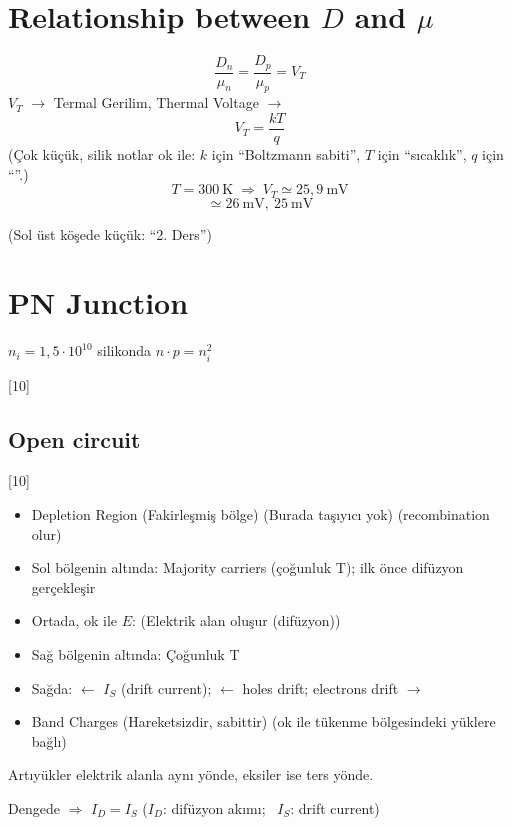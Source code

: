 \documentclass[11pt,a4paper]{article}
\begin{document}
\section{Relationship between $D$ and $\mu$}
\noindent {}
\[ \frac{D_n}{\mu_n} = \frac{D_p}{\mu_p} = V_T \]
$V_T$ $\rightarrow$ Termal Gerilim, Thermal Voltage $\rightarrow$
\[ V_T = \frac{kT}{q} \]
{\small\color{kursunkalem}(Çok küçük, silik notlar ok ile: $k$ için ``Boltzmann sabiti'', $T$ için ``sıcaklık'', $q$ için ``''.)}
\[ T = 300\ \mathrm{K} \;\Rightarrow\; V_T \simeq 25{,}9\ \mathrm{mV} \]
\[ \simeq 26\ \mathrm{mV},\ 25\ \mathrm{mV} \]

{\small\color{kursunkalem}(Sol üst köşede küçük: ``2. Ders'')}
\section{PN Junction}
$n_i = 1{,}5\cdot10^{10}$ silikonda \qquad\qquad $n\cdot p = n_i^2$

[10]

\subsection{Open circuit}
[10]
\begin{itemize}
  \item Depletion Region (Fakirleşmiş bölge) (Burada taşıyıcı yok) (recombination olur)
  \item Sol bölgenin altında: Majority carriers (çoğunluk T); ilk önce difüzyon gerçekleşir
  \item Ortada, ok ile $E$: (Elektrik alan oluşur (difüzyon))
  \item Sağ bölgenin altında: Çoğunluk T
  \item Sağda: $\leftarrow$ $I_S$ (drift current); $\leftarrow$ holes drift; electrons drift $\rightarrow$
  \item Band Charges (Hareketsizdir, sabittir) \quad (ok ile tükenme bölgesindeki yüklere bağlı)
\end{itemize}

\noindent Artıyükler elektrik alanla aynı yönde, eksiler ise ters yönde.

\noindent Dengede $\Rightarrow$ \quad $I_D = I_S$ \quad ($I_D$: difüzyon akımı; \ $I_S$: drift current)

\begin{center}
\end{center}
\end{document}
